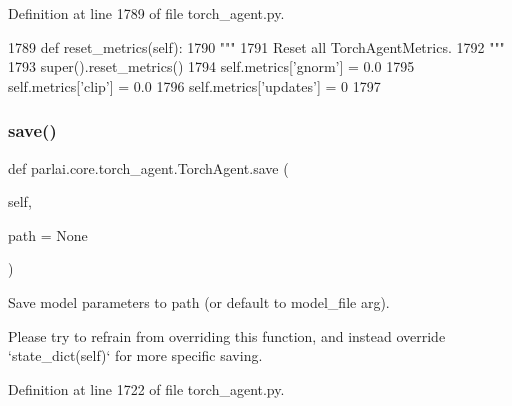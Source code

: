 Definition at line 1789 of file torch\+\_\+agent.\+py.


\begin{DoxyCode}
1789     \textcolor{keyword}{def }reset\_metrics(self):
1790         \textcolor{stringliteral}{"""}
1791 \textcolor{stringliteral}{        Reset all TorchAgentMetrics.}
1792 \textcolor{stringliteral}{        """}
1793         super().reset\_metrics()
1794         self.metrics[\textcolor{stringliteral}{'gnorm'}] = 0.0
1795         self.metrics[\textcolor{stringliteral}{'clip'}] = 0.0
1796         self.metrics[\textcolor{stringliteral}{'updates'}] = 0
1797 
\end{DoxyCode}
\mbox{\label{classparlai_1_1core_1_1torch__agent_1_1TorchAgent_adac7ee3db855786e8414e9f35fcb6e46}} 
\subsubsection{\texorpdfstring{save()}{save()}}
{\footnotesize\ttfamily def parlai.\+core.\+torch\+\_\+agent.\+Torch\+Agent.\+save (\begin{DoxyParamCaption}\item[{}]{self,  }\item[{}]{path = {\ttfamily None} }\end{DoxyParamCaption})}

\begin{DoxyVerb}Save model parameters to path (or default to model_file arg).

Please try to refrain from overriding this function, and instead override
`state_dict(self)` for more specific saving.
\end{DoxyVerb}
 

Definition at line 1722 of file torch\+\_\+agent.\+py.


